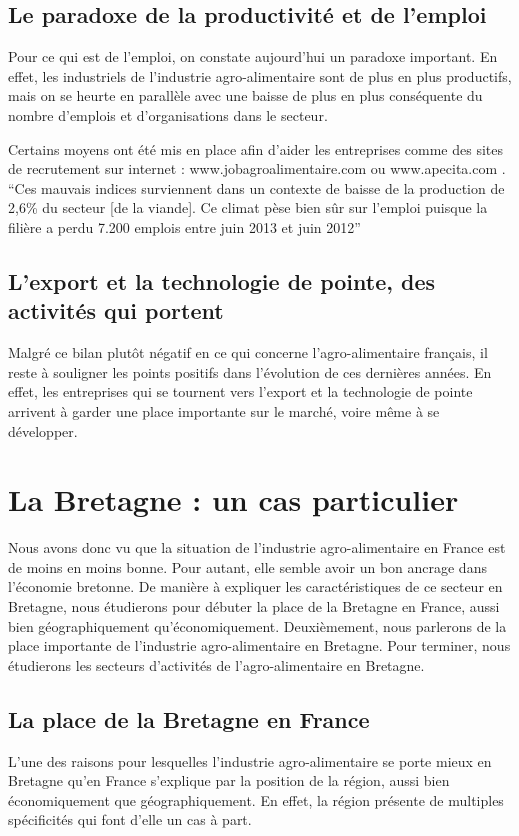\documentclass[a4paper,10pt]{report}
\begin{document}
		\subsection{Le paradoxe de la productivité et de l'emploi}
			Pour ce qui est de l’emploi, on constate aujourd’hui un paradoxe important. En effet, les industriels de l’industrie agro-alimentaire sont de plus en plus productifs, mais on se heurte en parallèle avec une baisse de plus en plus conséquente du nombre d’emplois et d’organisations dans le secteur.
			
			Certains moyens ont été mis en place afin d’aider les entreprises comme des sites de recrutement sur internet : www.jobagroalimentaire.com ou www.apecita.com .  “Ces mauvais indices surviennent dans un contexte de baisse de la production de 2,6\% du secteur [de la viande].
			Ce climat pèse bien sûr sur l'emploi puisque la filière a perdu 7.200 emplois entre juin 2013 et juin 2012”

		\subsection{L'export et la technologie de pointe, des activités qui portent}
			Malgré ce bilan plutôt négatif en ce qui concerne l’agro-alimentaire français, il reste à souligner les points positifs dans l’évolution de ces dernières années. En effet, les entreprises qui se tournent vers l’export et la technologie de pointe arrivent à garder une place importante sur le marché, voire même à se développer.

	\section{La Bretagne : un cas particulier}
	Nous avons donc vu que la situation de l’industrie agro-alimentaire en France est de moins en moins bonne. Pour autant, elle semble avoir un bon ancrage dans l’économie bretonne. De manière à expliquer les caractéristiques de ce secteur en Bretagne, nous étudierons pour débuter la place de la Bretagne en France, aussi bien géographiquement qu’économiquement. Deuxièmement, nous parlerons de la place importante de l’industrie agro-alimentaire en Bretagne. Pour terminer, nous étudierons les secteurs d’activités de l’agro-alimentaire en Bretagne.

		\subsection{La place de la Bretagne en France}
			L’une des raisons pour lesquelles l’industrie agro-alimentaire se porte mieux en Bretagne qu’en France s’explique par la position de la région, aussi bien économiquement que géographiquement. En effet, la région présente de multiples spécificités qui font d’elle un cas à part.
			
\end{document}
